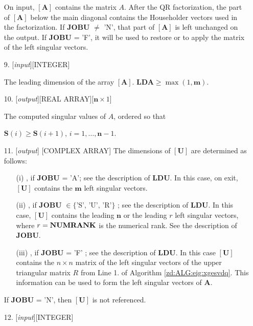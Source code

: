 \documentclass[12pt, a4paper, final]{article}
\numberwithin{equation}{section}
\begin{document}
\begin{itemize}
	On input, $\mathbf{[A]}$ contains the matrix $A$. After the QR factorization, the part of $\mathbf{[A]}$ below the main diagonal contains the Householder vectors used in the factorization. If \textbf{JOBU} $\neq$ 'N', that part of $\mathbf{[A]}$ is left unchanged on the output. If \textbf{JOBU} = 'F', it will be used to restore or to apply the matrix of the left singular vectors.
	
	\item[9.]  [\emph{input}][{\sc INTEGER}]
	
	The leading dimension of the array $\mathbf{[A]}$.  \textbf{LDA}$\geq\max(1,\mathbf{m})$.
	
	\item[10.]  [\emph{output}][{\sc REAL ARRAY}][$\mathbf{n}\times 1$]
	
	The computed singular values of $A$, ordered so that
	
	 $\mathbf{S}(i)\geq \mathbf{S}(i+1)$, $i=1,\ldots, \mathbf{n}-1$.
	
	\item[11.]  [\emph{output}]
	[{\sc COMPLEX ARRAY}] The dimensions of $\mathbf{[U]}$ are determined as follows:
	\begin{itemize}
		\item[(i)] , if \textbf{JOBU} = 'A'; see the description of \textbf{LDU}. In this case, on exit, $\mathbf{[U]}$ contains the $\mathbf{m}$ left singular vectors.
		\item[(ii)] , if \textbf{JOBU} $\in\{\mbox{'S', 'U', 'R'}\}$ ; see the description of \textbf{LDU}. In this   case, $\mathbf{[U]}$ contains the leading $\mathbf{n}$ or the leading $r$ left singular vectors, where $r=\mbox{\textbf{NUMRANK}}$ is the numerical rank. See the description of \textbf{JOBU}.
		\item[(iii)] , if \textbf{JOBU} = 'F' ; see the description of \textbf{LDU}. In this case $\mathbf{[U]}$   contains the $n\times n$ matrix of the left singular vectors of the upper triangular matrix $R$ from Line 1. of Algorithm \ref{zd:ALG:eig:xgesvdq}. This information can be used to form the left singular vectors of $\mathbf{A}$.
	\end{itemize}
	If \textbf{JOBU} = 'N', then $\mathbf{[U]}$ is not referenced. 
	
	\item[12.]   [\emph{input}][{\sc INTEGER}]
	

\end{itemize}
\end{document}
